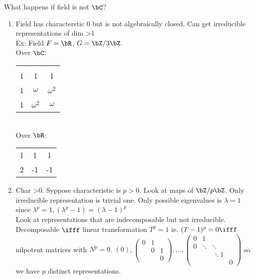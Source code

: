 \noindent
What happens if field is not $\bC$? 
\begin{enumerate}
    \item Field has characterstic 0 but is not algebraically closed. Can get irreducible representations of dim >1 \\ 
    Ex: Field $F = \bR$, $G = \bZ/3\bZ$ \\
    Over $\bC$: 
    \begin{tabular}{| c c c |} 
        \hline \\ 
        1 & 1 & 1 \\ 
        1 & $\omega$ & $\omega^2$ \\ 
        1 & $\omega^2$ & $\omega$ \\ \hline     
    \end{tabular} \quad \\
    Over $\bR$: 
    \begin{tabular}{| c c c|}
        1 & 1 & 1 \\ 
        2 & -1 & -1
    \end{tabular}
    \item Char >0. Syppose characteristic is $p>0$. Look at maps of $\bZ/p\bZ$. Only irreducible representation is trivial one. Only possible eigenvalues is $\lambda = 1$ since $\lambda^p=1, (\lambda^p-1) = (\lambda-1)^p$ \\
    Look at representations that are indecomposable but not irreducible. Decomposable $\ifff$ linear transformation $T^p=1$ ie. $(T-1)^p=0 \ifff$ nilpotent matrices with $N^p=0$. $(0), \begin{pmatrix} 0 & 1 & \\ & 0 & 1 \\ & & 0 \end{pmatrix}, \ldots, \begin{pmatrix} 0 & 1 & & \\ 0 & \ddots & \ddots & \\ & & \ddots 1 & \\ & & & 0 \end{pmatrix}$ so we have $p$ distinct representations. 
\end{enumerate}

